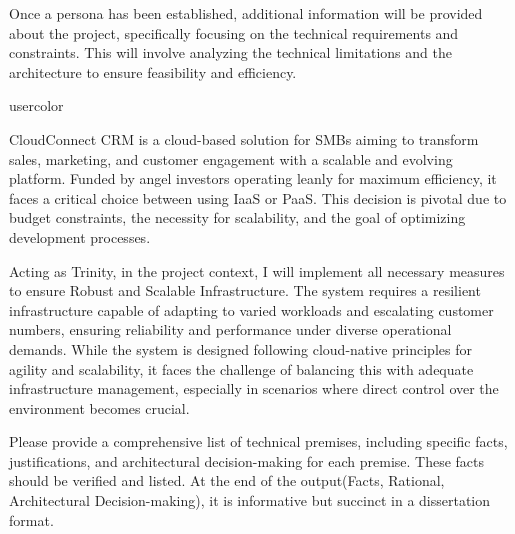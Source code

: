  Once a persona has been established, additional information will be provided about the project, specifically focusing on the technical requirements and constraints. This will involve analyzing the technical limitations and the architecture to ensure feasibility and efficiency.

\begin{chatin}{usercolor}{}

CloudConnect CRM is a cloud-based solution for SMBs aiming to transform sales, marketing, and customer engagement with a scalable and evolving platform. Funded by angel investors operating leanly for maximum efficiency, it faces a critical choice between using IaaS or PaaS. This decision is pivotal due to budget constraints, the necessity for scalability, and the goal of optimizing development processes.

Acting as Trinity, in the project context, I will implement all necessary measures to ensure Robust and Scalable Infrastructure. The system requires a resilient infrastructure capable of adapting to varied workloads and escalating customer numbers, ensuring reliability and performance under diverse operational demands. While the system is designed following cloud-native principles for agility and scalability, it faces the challenge of balancing this with adequate infrastructure management, especially in scenarios where direct control over the environment becomes crucial.

Please provide a comprehensive list of technical premises, including specific facts, justifications, and architectural decision-making for each premise. These facts should be verified and listed. At the end of the output(Facts, Rational, Architectural Decision-making), it is informative but succinct in a dissertation format.

\end{chatin}

